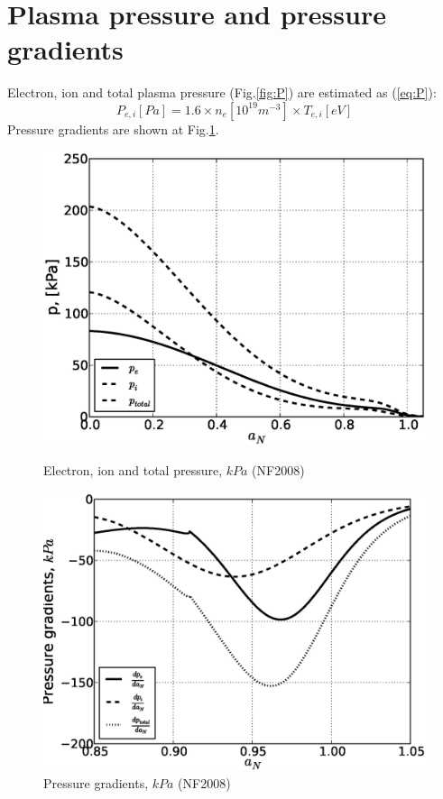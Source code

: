 \documentclass[11pt,oneside,a4paper,notitlepage]{article}
\begin{document}
\section{Plasma pressure and pressure gradients}
Electron, ion and total plasma pressure (Fig.\ref{fig:P}) are estimated as (\ref{eq:P}):
\begin{equation}\label{eq:P}
 P_{e,i}[Pa]=1.6\times n_e [10^{19}m^{-3}] \times T_{e,i}[eV]
\end{equation}
Pressure gradients are shown at Fig.\ref{fig:DP}.
\begin{figure}[h]
\begin{center}
\begin{minipage}[ht]{0.4\linewidth} 
 \centering
 \includegraphics[width=1.35\linewidth]{P.eps}
 \caption{Electron, ion and total pressure, $kPa$ (NF2008)}
 \label{fig:P}
\end{minipage}
\hfill
\begin{minipage}[ht]{0.4\linewidth} 
 \centering
 \includegraphics[width=1.35\linewidth]{DP.eps}
 \caption{Pressure gradients, $kPa$ (NF2008)}
 \label{fig:DP}
\end{minipage}
\end{center}
\end{figure}
\end{document}
